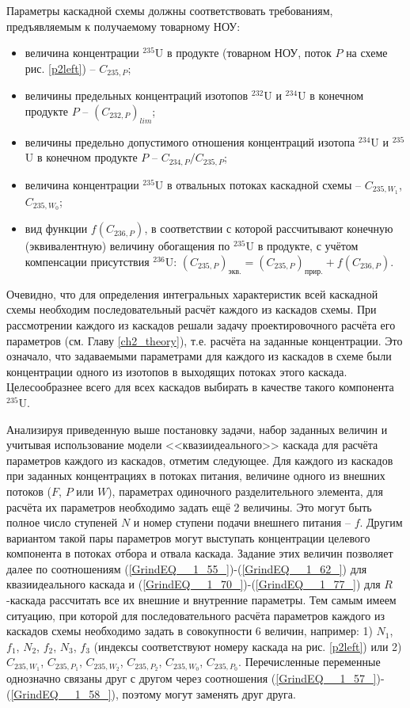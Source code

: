 Параметры каскадной схемы должны соответствовать требованиям, предъявляемым к получаемому товарному НОУ:

\begin{itemize}
    \item величина концентрации $^{235}$U в продукте (товарном НОУ, поток $P$ на схеме рис. \ref{p2left}) -- $C_{235,{P}}$;
    \item величины предельных концентраций изотопов $^{232}$U и $^{234}$U в конечном продукте $P$ -- $(C_{232,{P}})_{lim}$;
    \item величины предельно допустимого отношения концентраций изотопа $^{234}$U и $^{235}$U в конечном продукте $P$ -- ${C_{234,{P}}}/{C_{235,{P}}}$;
    \item величина концентрации $^{235}$U в отвальных потоках каскадной схемы -- $C_{235,{W_1}}$, $C_{235,{W_0}}$;
    \item вид функции $f(C_{236,P})$, в соответствии с которой рассчитывают конечную (эквивалентную) величину обогащения по $^{235}$U в продукте, с учётом компенсации присутствия $^{236}$U:
    $(C_{235,P})_\textit{экв.}=(C_{235,P})_\textit{прир.}+f(C_{236,P})$.    
\end{itemize}

Очевидно, что для определения интегральных характеристик всей каскадной схемы необходим последовательный расчёт каждого из каскадов схемы. При рассмотрении каждого из каскадов решали задачу проектировочного расчёта его параметров (см. Главу \ref{ch2_theory}), т.е. расчёта на заданные концентрации. Это означало, что задаваемыми параметрами для каждого из каскадов в схеме были концентрации одного из изотопов в выходящих потоках этого каскада. Целесообразнее всего для всех каскадов выбирать в качестве такого компонента $^{235}$U.

Анализируя приведенную выше постановку задачи, набор заданных величин и учитывая использование модели <<квазиидеального>> каскада для расчёта параметров каждого из каскадов, отметим следующее. Для каждого из каскадов при заданных концентрациях в потоках питания, величине одного из внешних потоков ($F$, $P$ или $W$), параметрах одиночного разделительного элемента, для расчёта их параметров необходимо задать ещё 2 величины. Это могут быть полное число ступеней $N$ и номер ступени подачи внешнего питания -- $f$. Другим вариантом такой пары параметров могут выступать концентрации целевого компонента в потоках отбора и отвала каскада. Задание этих величин позволяет далее по соотношениям (\ref{GrindEQ__1_55_})-(\ref{GrindEQ__1_62_}) для квазиидеального каскада и (\ref{GrindEQ__1_70_})-(\ref{GrindEQ__1_77_}) для $R$-каскада рассчитать все их внешние и внутренние параметры. Тем самым имеем ситуацию, при которой для последовательного расчёта параметров каждого из каскадов схемы необходимо задать в совокупности 6 величин, например: 1) $N_1$, $f_1$, $N_2$, $f_2$, $N_3$, $f_3$ (индексы соответствуют номеру каскада на рис. \ref{p2left}) или 2) $C_{235,{W_1}}$, $C_{235,{P_1}}$, $C_{235,{W_2}}$, $C_{235,{P_2}}$, $C_{235,{W_0}}$, $C_{235,{P_0}}$. Перечисленные переменные однозначно связаны друг с другом через соотношения (\ref{GrindEQ__1_57_})-(\ref{GrindEQ__1_58_}), поэтому могут заменять друг друга. 

